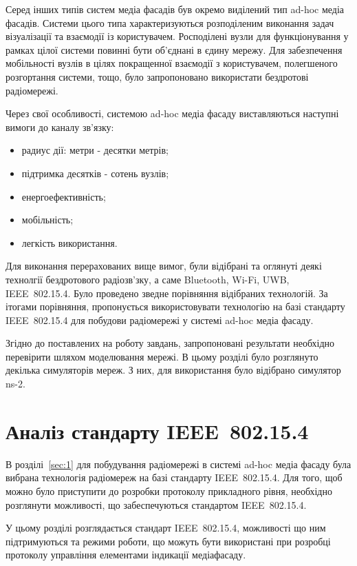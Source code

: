 \documentclass[a4paper,ukrainian,utf8,nocolumnsxix,floatsection,equationsection]{eskdtext}
\let\stdsection\section
\renewcommand\section{\clearpage\stdsection}
\newcommand{\iee}[0]{IEEE~802.15.4\xspace}
\begin{document}
Серед інших типів систем медіа фасадів був окремо виділений тип ad-hoc медіа фасадів. Системи цього типа характеризуються розподіленим виконання задач візуалізації та взаємодії із користувачем. Росподілені вузли для функціонування у рамках цілої системи повинні бути об’єднані в єдину мережу. Для забезпечення мобільності вузлів в цілях покращенної взаємодії з користувачем, полегшеного розгортання системи, тощо, було запропоновано використати бездротові радіомережі.

Через свої особливості, системою ad-hoc медіа фасаду виставляються наступні вимоги до каналу зв’язку:
\begin{itemize}
	\item радиус дії: метри - десятки метрів;
	\item підтримка десятків - сотень вузлів;
	\item енергоефективність;
	\item мобільність;
	\item легкість використання.
\end{itemize}

Для виконання перерахованих вище вимог, були відібрані та оглянуті деякі технолгії бездротового радіозв’зку, а саме Bluetooth, Wi-Fi, UWB, \iee. Було проведено зведне порівняння відібраних технологій. За ітогами порівняння, пропонується використовувати технологію на базі стандарту \iee для побудови радіомережі у системі ad-hoc медіа фасаду. 

Згідно до поставлених на роботу завдань, запропоновані результати необхідно перевірити шляхом моделювання мережі. В цьому розділі було розглянуто декілька симуляторів мереж. З них, для використання було відібрано симулятор ns-2.



\section{Аналіз стандарту \iee}
\label{sec:ieee:standard:analysis}

В розділі~\ref{sec:1} для побудування радіомережі в системі ad-hoc медіа фасаду була вибрана технологія радіомереж на базі стандарту \iee. Для того, щоб можно було приступити до розробки протоколу прикладного рівня, необхідно розглянути можливості, що забеспечуються стандартом \iee.

У цьому розділі розглядається стандарт \iee, можливості що ним підтримуються та режими роботи, що можуть бути використані при розробці протоколу управління елементами індикації медіафасаду. 
\end{document}
